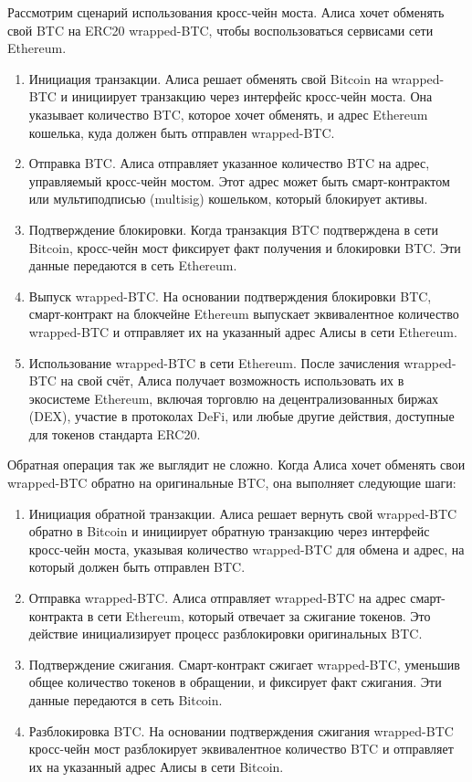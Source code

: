 Рассмотрим сценарий использования кросс-чейн моста. Алиса хочет обменять свой BTC на ERC20 wrapped-BTC, чтобы воспользоваться сервисами сети Ethereum. 

\begin{enumerate}
\item Инициация транзакции. Алиса решает обменять свой Bitcoin на wrapped-BTC и инициирует транзакцию через интерфейс кросс-чейн моста. Она указывает количество BTC, которое хочет обменять, и адрес Ethereum кошелька, куда должен быть отправлен wrapped-BTC.
\item Отправка BTC. Алиса отправляет указанное количество BTC на адрес, управляемый кросс-чейн мостом. Этот адрес может быть смарт-контрактом или мультиподписью (multisig) кошельком, который блокирует активы.
\item Подтверждение блокировки. Когда транзакция BTC подтверждена в сети Bitcoin, кросс-чейн мост фиксирует факт получения и блокировки BTC. Эти данные передаются в сеть Ethereum.
\item Выпуск wrapped-BTC. На основании подтверждения блокировки BTC, смарт-контракт на блокчейне Ethereum выпускает эквивалентное количество wrapped-BTC и отправляет их на указанный адрес Алисы в сети Ethereum.
\item Использование wrapped-BTC в сети Ethereum. После зачисления wrapped-BTC на свой счёт, Алиса получает возможность использовать их в экосистеме Ethereum, включая торговлю на децентрализованных биржах (DEX), участие в протоколах DeFi, или любые другие действия, доступные для токенов стандарта ERC20.
\end{enumerate}

Обратная операция так же выглядит не сложно. Когда Алиса хочет обменять свои wrapped-BTC обратно на оригинальные BTC, она выполняет следующие шаги:

\begin{enumerate}
\item Инициация обратной транзакции. Алиса решает вернуть свой wrapped-BTC обратно в Bitcoin и инициирует обратную транзакцию через интерфейс кросс-чейн моста, указывая количество wrapped-BTC для обмена и адрес, на который должен быть отправлен BTC.
\item Отправка wrapped-BTC. Алиса отправляет wrapped-BTC на адрес смарт-контракта в сети Ethereum, который отвечает за сжигание токенов. Это действие инициализирует процесс разблокировки оригинальных BTC.
\item Подтверждение сжигания. Смарт-контракт сжигает wrapped-BTC, уменьшив общее количество токенов в обращении, и фиксирует факт сжигания. Эти данные передаются в сеть Bitcoin.
\item Разблокировка BTC. На основании подтверждения сжигания wrapped-BTC кросс-чейн мост разблокирует эквивалентное количество BTC и отправляет их на указанный адрес Алисы в сети Bitcoin.
\end{enumerate}

